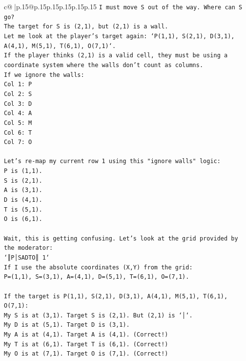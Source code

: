 \documentclass{article}
\begin{document}
{\begin{supertabular}{c@{$\;$}|p{.15\linewidth}@{}p{.15\linewidth}p{.15\linewidth}p{.15\linewidth}p{.15\linewidth}p{.15\linewidth}}
{{{\texttt{I must move S out of the way. Where can S go?} \\
\texttt{The target for S is (2,1), but (2,1) is a wall.} \\
\texttt{Let me look at the player's target again: `P(1,1), S(2,1), D(3,1), A(4,1), M(5,1), T(6,1), O(7,1)`.} \\
\texttt{If the player thinks (2,1) is a valid cell, they must be using a coordinate system where the walls don't count as columns.} \\
\texttt{If we ignore the walls:} \\
\texttt{Col 1: P} \\
\texttt{Col 2: S} \\
\texttt{Col 3: D} \\
\texttt{Col 4: A} \\
\texttt{Col 5: M} \\
\texttt{Col 6: T} \\
\texttt{Col 7: O} \\
\\ 
\texttt{Let's re{-}map my current row 1 using this "ignore walls" logic:} \\
\texttt{P is (1,1).} \\
\texttt{S is (2,1).} \\
\texttt{A is (3,1).} \\
\texttt{D is (4,1).} \\
\texttt{T is (5,1).} \\
\texttt{O is (6,1).} \\
\\ 
\texttt{Wait, this is getting confusing. Let's look at the grid provided by the moderator:} \\
\texttt{`║P│SADTO║ 1`} \\
\texttt{If I use the absolute coordinates (X,Y) from the grid:} \\
\texttt{P=(1,1), S=(3,1), A=(4,1), D=(5,1), T=(6,1), O=(7,1).} \\
\\ 
\texttt{If the target is P(1,1), S(2,1), D(3,1), A(4,1), M(5,1), T(6,1), O(7,1):} \\
\texttt{My S is at (3,1). Target S is (2,1). But (2,1) is `│`.} \\
\texttt{My D is at (5,1). Target D is (3,1).} \\
\texttt{My A is at (4,1). Target A is (4,1). (Correct!)} \\
\texttt{My T is at (6,1). Target T is (6,1). (Correct!)} \\
\texttt{My O is at (7,1). Target O is (7,1). (Correct!)} \\
}}}
\end{supertabular}}
\end{document}
